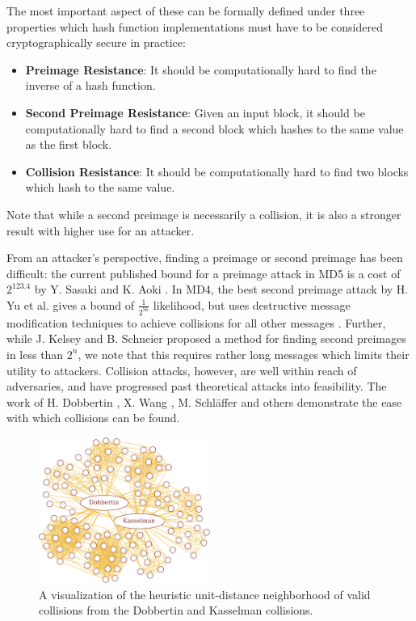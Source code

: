 \documentclass[conference]{IEEEtran}
\begin{document}
The most important aspect of these can be formally defined under three
properties which hash function implementations must have to be
considered cryptographically secure in practice:
\begin{itemize}
    \item \textbf{Preimage Resistance}: It should be computationally hard to find
        the inverse of a hash function.
    \item \textbf{Second Preimage Resistance}: Given an input block, it should be
        computationally hard to find a second block which hashes to the
        same value as the first block.
    \item \textbf{Collision Resistance}: It should be computationally hard to find two
        blocks which hash to the same value.
\end{itemize}
Note that while a second preimage is necessarily a collision, it is also a
stronger result with higher use for an attacker.

From an attacker's perspective, finding a preimage or second preimage has been
difficult: the current published bound for a preimage attack in MD5 is a cost
of $2^{123.4}$ by Y. Sasaki and K. Aoki \cite{SasakiPreimage}. In MD4, the
best second preimage attack by H. Yu et al. gives a bound of $\frac{1}{2^{56}}$
likelihood, but uses destructive message modification techniques to achieve
collisions for all other messages \cite{cryptoeprint:2007:206}. Further, while
J. Kelsey and B. Schneier proposed a method for finding second preimages
in less than $2^n$, we note that this requires rather long messages
\cite{SchneierSecondPreimage} which limits their utility to
attackers. Collision attacks, however, are well within reach
of adversaries, and have progressed past theoretical attacks into feasibility. The work of
H. Dobbertin \cite{Dobbertin1998}, X. Wang \cite{cryptoeprint:2004:199},
M. Schl{\"a}ffer \cite{Schlaffer2006} and others demonstrate the ease with which
collisions can be found.

\begin{figure}
\begin{center}
\includegraphics[width=0.5\textwidth]{Figs/graph-intro-crop.pdf}
\caption{A visualization of the heuristic unit-distance neighborhood
  of valid collisions from the Dobbertin and Kasselman collisions.}
\label{Fig:Graph-Intro}
\end{center}
\end{figure}
\end{document}
